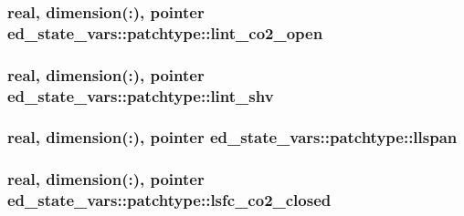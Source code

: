 \subsubsection[{\texorpdfstring{lint\+\_\+co2\+\_\+open}{lint_co2_open}}]{\setlength{\rightskip}{0pt plus 5cm}real, dimension(\+:), pointer ed\+\_\+state\+\_\+vars\+::patchtype\+::lint\+\_\+co2\+\_\+open}\hypertarget{structed__state__vars_1_1patchtype_aea52f4d0f0e1f4f9e606def838d1b88c}{}\label{structed__state__vars_1_1patchtype_aea52f4d0f0e1f4f9e606def838d1b88c}
\subsubsection[{\texorpdfstring{lint\+\_\+shv}{lint_shv}}]{\setlength{\rightskip}{0pt plus 5cm}real, dimension(\+:), pointer ed\+\_\+state\+\_\+vars\+::patchtype\+::lint\+\_\+shv}\hypertarget{structed__state__vars_1_1patchtype_aed6db20a6a03085744723d855474e73e}{}\label{structed__state__vars_1_1patchtype_aed6db20a6a03085744723d855474e73e}
\subsubsection[{\texorpdfstring{llspan}{llspan}}]{\setlength{\rightskip}{0pt plus 5cm}real, dimension(\+:), pointer ed\+\_\+state\+\_\+vars\+::patchtype\+::llspan}\hypertarget{structed__state__vars_1_1patchtype_ac20303a70275acd9ec3b166b4c3740cd}{}\label{structed__state__vars_1_1patchtype_ac20303a70275acd9ec3b166b4c3740cd}
\subsubsection[{\texorpdfstring{lsfc\+\_\+co2\+\_\+closed}{lsfc_co2_closed}}]{\setlength{\rightskip}{0pt plus 5cm}real, dimension(\+:), pointer ed\+\_\+state\+\_\+vars\+::patchtype\+::lsfc\+\_\+co2\+\_\+closed}\hypertarget{structed__state__vars_1_1patchtype_ab52950d2e035fb1f0536a5fb184e9d0c}{}\label{structed__state__vars_1_1patchtype_ab52950d2e035fb1f0536a5fb184e9d0c}
